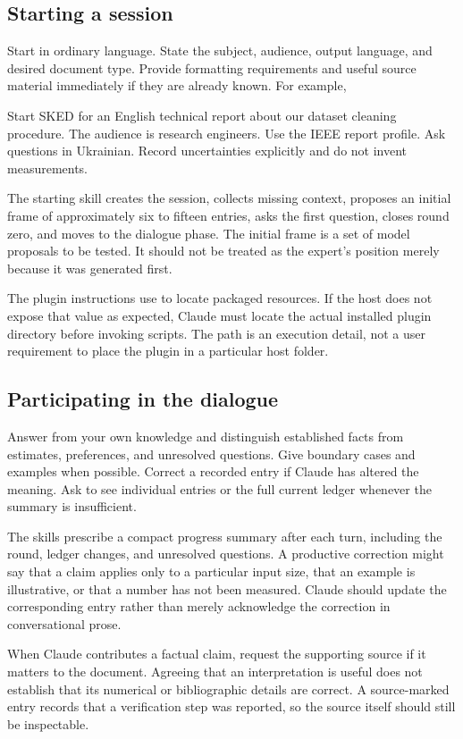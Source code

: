 \documentclass[12pt,a4paper]{article}
\newcommand{\code}[1]{\texttt{\detokenize{#1}}}
\begin{document}
\subsection{Starting a session}
Start in ordinary language. State the subject, audience, output language, and desired document type. Provide formatting requirements and useful source material immediately if they are already known. For example,
\begin{Code}
Start SKED for an English technical report about our dataset
cleaning procedure. The audience is research engineers.
Use the IEEE report profile. Ask questions in Ukrainian.
Record uncertainties explicitly and do not invent measurements.
\end{Code}
The starting skill creates the session, collects missing context, proposes an initial frame of approximately six to fifteen entries, asks the first question, closes round zero, and moves to the dialogue phase. The initial frame is a set of model proposals to be tested. It should not be treated as the expert's position merely because it was generated first.

The plugin instructions use \code{CLAUDE_PLUGIN_ROOT} to locate packaged resources. If the host does not expose that value as expected, Claude must locate the actual installed plugin directory before invoking scripts. The path is an execution detail, not a user requirement to place the plugin in a particular host folder.

\subsection{Participating in the dialogue}
Answer from your own knowledge and distinguish established facts from estimates, preferences, and unresolved questions. Give boundary cases and examples when possible. Correct a recorded entry if Claude has altered the meaning. Ask to see individual entries or the full current ledger whenever the summary is insufficient.

The skills prescribe a compact progress summary after each turn, including the round, ledger changes, and unresolved questions. A productive correction might say that a claim applies only to a particular input size, that an example is illustrative, or that a number has not been measured. Claude should update the corresponding entry rather than merely acknowledge the correction in conversational prose.

When Claude contributes a factual claim, request the supporting source if it matters to the document. Agreeing that an interpretation is useful does not establish that its numerical or bibliographic details are correct. A source-marked entry records that a verification step was reported, so the source itself should still be inspectable.
\end{document}
